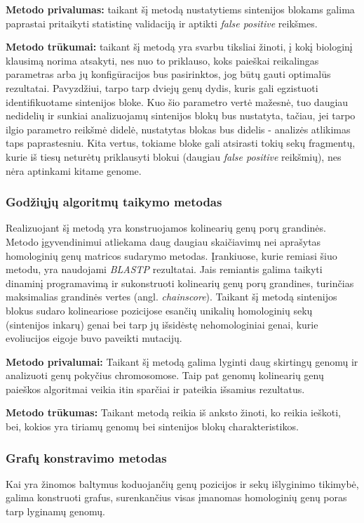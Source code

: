\documentclass[12pt]{article}
\begin{document}
\textbf{Metodo privalumas:} taikant šį metodą nustatytiems sintenijos blokams
galima paprastai pritaikyti statistinę validaciją ir aptikti
\emph{false positive} reikšmes.

\textbf{Metodo trūkumai:} taikant šį metodą yra svarbu tiksliai žinoti, į kokį
biologinį klausimą norima atsakyti, nes nuo to priklauso, koks paieškai
reikalingas parametras arba jų konfigūracijos bus pasirinktos, jog būtų gauti
optimalūs rezultatai. Pavyzdžiui, tarpo tarp dviejų genų dydis, kuris gali
egzistuoti identifikuotame sintenijos bloke. Kuo šio parametro vertė mažesnė,
tuo daugiau nedidelių ir sunkiai analizuojamų sintenijos blokų bus nustatyta,
tačiau, jei tarpo ilgio parametro reikšmė didelė, nustatytas blokas bus didelis
- analizės atlikimas taps paprastesniu. Kita vertus, tokiame bloke gali
atsirasti tokių sekų fragmentų, kurie iš tiesų neturėtų priklausyti blokui
(daugiau \emph{false positive} reikšmių), nes nėra aptinkami kitame genome.

\subsubsection*{Godžiųjų algoritmų taikymo metodas}
Realizuojant šį metodą yra konstruojamos kolinearių genų porų grandinės. Metodo
įgyvendinimui atliekama daug daugiau skaičiavimų nei aprašytas homologinių genų
matricos sudarymo metodas.
Įrankiuose, kurie remiasi šiuo metodu, yra naudojami \emph{BLASTP} rezultatai.
Jais remiantis galima taikyti dinaminį programavimą ir sukonstruoti kolinearių
genų porų grandines, turinčias maksimalias grandinės vertes (angl. 
\emph{chainscore}). Taikant šį metodą sintenijos blokus sudaro kolineariose
pozicijose esančių unikalių homologinių sekų (sintenijos inkarų) genai bei tarp
jų išsidėstę nehomologiniai genai, kurie evoliucijos eigoje buvo paveikti
mutacijų.

\textbf{Metodo privalumai:} Taikant šį metodą galima lyginti daug skirtingų
genomų ir analizuoti genų pokyčius chromosomose. Taip pat genomų kolinearių
genų paieškos algoritmai veikia itin sparčiai ir pateikia išsamius rezultatus.

\textbf{Metodo trūkumas:} Taikant metodą reikia iš anksto žinoti, ko reikia
ieškoti, bei, kokios yra tiriamų genomų bei sintenijos blokų charakteristikos.

\subsubsection*{Grafų konstravimo metodas}
Kai yra žinomos baltymus koduojančių genų pozicijos ir sekų išlyginimo tikimybė,
galima konstruoti grafus, surenkančius visas įmanomas homologinių genų poras
tarp lyginamų genomų.
\end{document}
